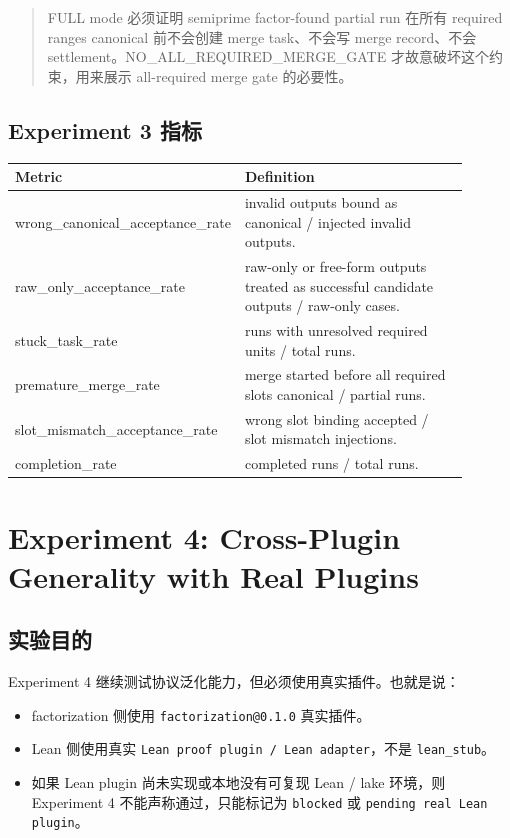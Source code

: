 \documentclass[11pt]{ctexart}
\begin{document}
\begin{quote}
FULL mode 必须证明 semiprime factor-found partial run 在所有 required ranges canonical 前不会创建 merge task、不会写 merge record、不会 settlement。NO\_ALL\_REQUIRED\_MERGE\_GATE 才故意破坏这个约束，用来展示 all-required merge gate 的必要性。
\end{quote}

\subsection{Experiment 3 指标}

\begin{longtable}{p{0.36\linewidth}p{0.54\linewidth}}
\toprule
Metric & Definition \\
\midrule
wrong\_canonical\_acceptance\_rate & invalid outputs bound as canonical / injected invalid outputs. \\
raw\_only\_acceptance\_rate & raw-only or free-form outputs treated as successful candidate outputs / raw-only cases. \\
stuck\_task\_rate & runs with unresolved required units / total runs. \\
premature\_merge\_rate & merge started before all required slots canonical / partial runs. \\
slot\_mismatch\_acceptance\_rate & wrong slot binding accepted / slot mismatch injections. \\
completion\_rate & completed runs / total runs. \\
\bottomrule
\end{longtable}

\section{Experiment 4: Cross-Plugin Generality with Real Plugins}

\subsection{实验目的}

Experiment 4 继续测试协议泛化能力，但必须使用真实插件。也就是说：

\begin{itemize}[leftmargin=2em]
  \item factorization 侧使用 \texttt{factorization@0.1.0} 真实插件。
  \item Lean 侧使用真实 \texttt{Lean proof plugin / Lean adapter}，不是 \texttt{lean\_stub}。
  \item 如果 Lean plugin 尚未实现或本地没有可复现 Lean / lake 环境，则 Experiment 4 不能声称通过，只能标记为 \texttt{blocked} 或 \texttt{pending real Lean plugin}。
\end{itemize}
\end{document}
